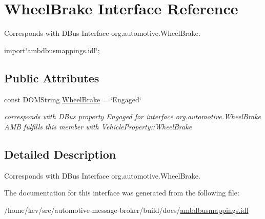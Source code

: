 \hypertarget{interfaceWheelBrake}{\section{Wheel\+Brake Interface Reference}
\label{interfaceWheelBrake}
}


Corresponds with D\+Bus Interface org.\+automotive.\+Wheel\+Brake.  




{\ttfamily import\char`\"{}ambdbusmappings.\+idl\char`\"{};}

\subsection*{Public Attributes}
\begin{DoxyCompactItemize}
\item 
\hypertarget{interfaceWheelBrake_aefe3f165494d64a9d241d239765c117b}{const D\+O\+M\+String \hyperlink{interfaceWheelBrake_aefe3f165494d64a9d241d239765c117b}{Wheel\+Brake} = \char`\"{}Engaged\char`\"{}}\label{interfaceWheelBrake_aefe3f165494d64a9d241d239765c117b}

\begin{DoxyCompactList}\small\item\em corresponds with D\+Bus property Engaged for interface org.\+automotive.\+Wheel\+Brake A\+M\+B fulfills this member with Vehicle\+Property\+::\+Wheel\+Brake \end{DoxyCompactList}\end{DoxyCompactItemize}


\subsection{Detailed Description}
Corresponds with D\+Bus Interface org.\+automotive.\+Wheel\+Brake. 

The documentation for this interface was generated from the following file\+:\begin{DoxyCompactItemize}
\item 
/home/kev/src/automotive-\/message-\/broker/build/docs/\hyperlink{ambdbusmappings_8idl}{ambdbusmappings.\+idl}\end{DoxyCompactItemize}
